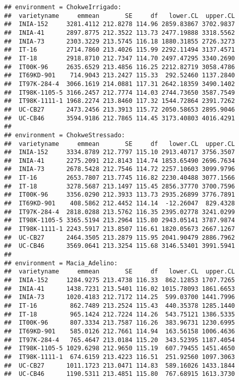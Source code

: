 \documentclass[]{book}
\theoremstyle{definition}
\theoremstyle{definition}
\theoremstyle{definition}
\theoremstyle{remark}
\begin{document}
\begin{verbatim}
## environment = ChokweIrrigado:
##  varietyname     emmean       SE     df   lower.CL  upper.CL
##  INIA-152     3281.4112 212.8278 114.96 2859.83867 3702.9837
##  INIA-41      2897.8775 212.3522 113.73 2477.19888 3318.5562
##  INIA-73      2303.3229 213.5745 116.18 1880.31855 2726.3273
##  IT-16        2714.7860 213.4026 115.99 2292.11494 3137.4571
##  IT-18        2918.8710 212.7347 114.70 2497.47295 3340.2690
##  IT00K-96     2635.6529 213.4856 116.25 2212.82719 3058.4786
##  IT69KD-901    714.9043 213.2427 115.33  292.52460 1137.2840
##  IT97K-284-4  3066.1619 214.0881 117.31 2642.18359 3490.1402
##  IT98K-1105-5 3166.2457 212.7774 114.03 2744.73650 3587.7549
##  IT98K-1111-1 1968.2274 213.8460 117.32 1544.72864 2391.7262
##  UC-CB27      2473.2456 213.3913 115.72 2050.58653 2895.9046
##  UC-CB46      3594.9186 212.7865 114.45 3173.40803 4016.4291
## 
## environment = ChokweStressado:
##  varietyname     emmean       SE     df   lower.CL  upper.CL
##  INIA-152     3334.8789 212.7797 115.10 2913.40717 3756.3507
##  INIA-41      2275.2091 212.8143 114.74 1853.65490 2696.7634
##  INIA-73      2678.5428 212.7546 114.72 2257.10603 3099.9796
##  IT-16        2653.7807 213.7745 116.82 2230.40488 3077.1566
##  IT-18        3278.5687 213.1497 115.45 2856.37770 3700.7596
##  IT00K-96     3356.0290 212.3933 113.73 2935.26899 3776.7891
##  IT69KD-901    408.5862 212.4452 114.14  -12.26047  829.4328
##  IT97K-284-4  2818.0288 213.5762 116.35 2395.02778 3241.0299
##  IT98K-1105-5 3365.5194 213.2964 115.80 2943.05141 3787.9874
##  IT98K-1111-1 2243.5917 213.8507 116.61 1820.05673 2667.1267
##  UC-CB27      2464.3505 213.2879 115.95 2041.90479 2886.7962
##  UC-CB46      3569.0641 213.3254 115.68 3146.53401 3991.5941
## 
## environment = Macia_Adelino:
##  varietyname     emmean       SE     df   lower.CL  upper.CL
##  INIA-152     1284.9275 213.4738 116.33  862.12853 1707.7265
##  INIA-41      1438.7231 213.5401 116.02 1015.78093 1861.6653
##  INIA-73      1020.4183 212.7172 114.25  599.03700 1441.7996
##  IT-16         862.7489 213.2524 115.43  440.35378 1285.1440
##  IT-18         965.1424 212.7224 114.26  543.75121 1386.5335
##  IT00K-96      807.3334 213.7587 116.26  383.96731 1230.6995
##  IT69KD-901    585.0126 212.7661 114.94  163.56158 1006.4636
##  IT97K-284-4   765.4647 213.0184 115.20  343.52395 1187.4054
##  IT98K-1105-5 1029.6298 212.9650 115.19  607.79455 1451.4650
##  IT98K-1111-1  674.6159 213.4223 116.51  251.92560 1097.3063
##  UC-CB27      1011.1723 213.0471 114.83  589.16026 1433.1844
##  UC-CB46      1190.5311 213.4851 115.80  767.68915 1613.3730

\end{verbatim}
\end{document}
